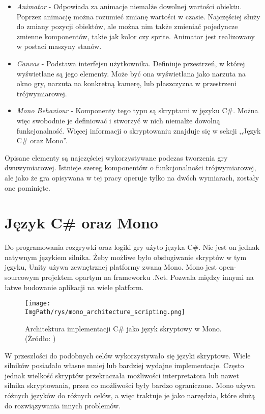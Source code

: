 \documentclass[a4paper,12pt,twoside,openany]{report}
\newcommand{\ImgPath}{.}
\begin{document}
\begin{itemize}
    \item \textit{Animator} - Odpowiada za animacje niemalże dowolnej wartości obiektu. Poprzez animację można rozumieć zmianę wartości w czasie. Najczęściej służy do zmiany pozycji obiektów, ale można nim także zmieniać pojedyncze zmienne komponentów, takie jak kolor czy sprite. Animator jest realizowany w postaci maszyny stanów.
    \item \textit{Canvas} - Podstawa interfejsu użytkownika. Definiuje przestrzeń, w której wyświetlane są jego elementy. Może być ona wyświetlana jako narzuta na okno gry, narzuta na konkretną kamerę, lub płaszczyzna w przestrzeni trójwymiarowej.
    \item \textit{Mono Behaviour} - Komponenty tego typu są skryptami w języku C\#. Można więc swobodnie je definiować i stworzyć w nich niemalże dowolną funkcjonalność. Więcej informacji o skryptowaniu znajduje się w sekcji ,,Język C\# oraz Mono''.
\end{itemize}
Opisane elementy są najczęściej wykorzystywane podczas tworzenia gry dwuwymiarowej. Istnieje szereg komponentów o funkcjonalności trójwymiarowej, ale jako że gra opisywana w tej pracy operuje tylko na dwóch wymiarach, zostały one pominięte.

\section{Język C\# oraz Mono}

Do programowania rozgrywki oraz logiki gry użyto języka C\#. Nie jest on jednak natywnym językiem silnika. Żeby możliwe było obsługiwanie skryptów w tym języku, Unity używa zewnętrznej platformy zwaną Mono. Mono jest open-sourcowym projektem opartym na frameworku .Net\cite{about_mono}. Pozwala między innymi na łatwe budowanie aplikacji na wiele platform.

\begin{figure}[!htbp]
	\begin{center}
\centering
\texttt{[image: \\ImgPath/rys/mono\_architecture\_scripting.png]}
\end{center}
	\caption{Architektura implementacji C\# jako język skryptowy w Mono. (Żródło: \cite{mono_scrpiting})}
	\label{mono_architecture_scripting}
\end{figure}

W przeszłości do podobnych celów wykorzystywało się języki skryptowe. Wiele silników posiadało własne mniej lub bardziej wydajne implementacje. Często jednak wielkość skryptów przekraczała możliwości interpretatora lub nawet silnika skryptowania, przez co możliwości były bardzo ograniczone. Mono używa różnych języków do różnych celów, a więc traktuje je jako narzędzia, które służą do rozwiązywania innych problemów.
\end{document}
